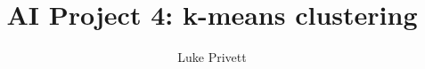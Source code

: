 \documentclass[]{report}
\title{AI Project 4: k-means clustering}
\author{Luke Privett}
\begin{document}
\maketitle

\begin{abstract}
	
	
\end{abstract}
\end{document}
